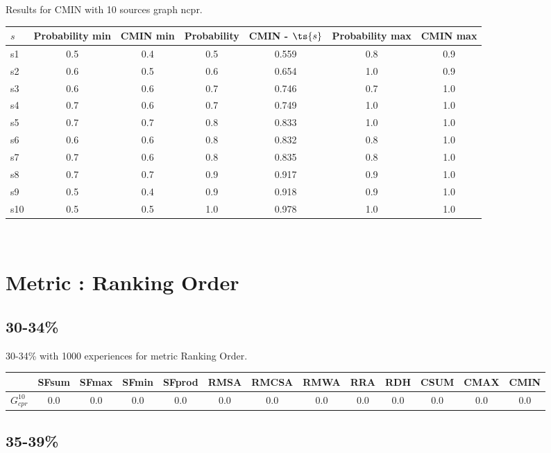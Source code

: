 \documentclass{article}
\newcommand{\graph}[2]{$G_{#1}^{#2}$}
\begin{document}
\noindent Results for CMIN with 10 sources graph ncpr.

\noindent\begin{tabular}{|l|c|c|c|c|c|c|}
\hline
$s$& Probability min & CMIN min & Probability & CMIN - $\ts{s}$ & Probability max & CMIN max\\
\hline
s1 &0.5 & 0.4 & 0.5 & 0.559 & 0.8 & 0.9\\
\hline
s2 &0.6 & 0.5 & 0.6 & 0.654 & 1.0 & 0.9\\
\hline
s3 &0.6 & 0.6 & 0.7 & 0.746 & 0.7 & 1.0\\
\hline
s4 &0.7 & 0.6 & 0.7 & 0.749 & 1.0 & 1.0\\
\hline
s5 &0.7 & 0.7 & 0.8 & 0.833 & 1.0 & 1.0\\
\hline
s6 &0.6 & 0.6 & 0.8 & 0.832 & 0.8 & 1.0\\
\hline
s7 &0.7 & 0.6 & 0.8 & 0.835 & 0.8 & 1.0\\
\hline
s8 &0.7 & 0.7 & 0.9 & 0.917 & 0.9 & 1.0\\
\hline
s9 &0.5 & 0.4 & 0.9 & 0.918 & 0.9 & 1.0\\
\hline
s10 &0.5 & 0.5 & 1.0 & 0.978 & 1.0 & 1.0\\
\hline
\end{tabular}\\

\newpage
\section{Metric : Ranking Order}

\newpage

\subsection{30-34\%}

30-34\% with 1000 experiences for metric Ranking Order.

\noindent\begin{tabular}{|l|c|c|c|c|c|c|c|c|c|c|c|c|}
\hline
& SFsum& SFmax& SFmin& SFprod& RMSA& RMCSA& RMWA& RRA& RDH& CSUM& CMAX& CMIN\\
\hline
\graph{cpr}{10} &0.0&0.0&0.0&0.0&0.0&0.0&0.0&0.0&0.0&0.0&0.0&0.0\\
\hline
\end{tabular}
\newpage

\subsection{35-39\%}
\end{document}
